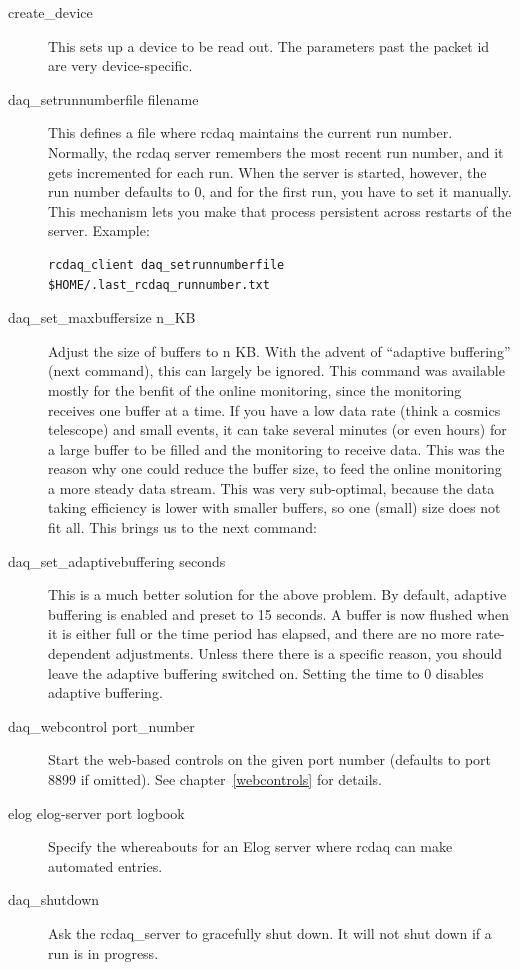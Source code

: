 \documentclass{article}[11pt]
\begin{document}
\begin{description}
\item[create\_device]
  This sets up a device to be read out. The parameters past the packet
  id are very device-specific. 

\item[daq\_setrunnumberfile filename] This defines a file where
  rcdaq maintains the current run number. Normally, the rcdaq server
  remembers the most recent run number, and it gets incremented for each run.
  When the server is started, however, the run number defaults to 0, and for the
  first run, you have to set it manually. This mechanism lets you make that 
  process persistent across restarts of the server. Example:

\begin{verbatim}
rcdaq_client daq_setrunnumberfile $HOME/.last_rcdaq_runnumber.txt
\end{verbatim}

\item[daq\_set\_maxbuffersize n\_KB] Adjust the size of buffers to n
  KB. With the advent of ``adaptive buffering'' (next command), this
  can largely be ignored. This command was available mostly for the
  benfit of the online monitoring, since the monitoring receives one
  buffer at a time. If you have a low data rate (think a cosmics
  telescope) and small events, it can take several minutes (or even
  hours) for a large buffer to be filled and the monitoring to receive
  data. This was the reason why one could reduce the buffer size, to
  feed the online monitoring a more steady data stream. This was very
  sub-optimal, because the data taking efficiency is lower with
  smaller buffers, so one (small) size does not fit all. This brings
  us to the next command:

\item[daq\_set\_adaptivebuffering seconds] This is a much better
  solution for the above problem. By default, adaptive buffering is
  enabled and preset to 15 seconds.  A buffer is now flushed when it
  is either full or the time period has elapsed, and there are no more
  rate-dependent adjustments. Unless there there is a specific reason,
  you should leave the adaptive buffering switched on. Setting the
  time to 0 disables adaptive buffering.

\item[daq\_webcontrol port\_number ] Start the web-based controls on
  the given port number (defaults to port 8899 if omitted). See
  chapter~\ref{webcontrols} for details.

\item[elog elog-server port logbook] Specify the whereabouts for an
  Elog server where rcdaq can make automated entries. 

\item[daq\_shutdown] Ask the rcdaq\_server to gracefully shut
  down.  It will not shut down if a run is in progress.

\end{description}
\end{document}
